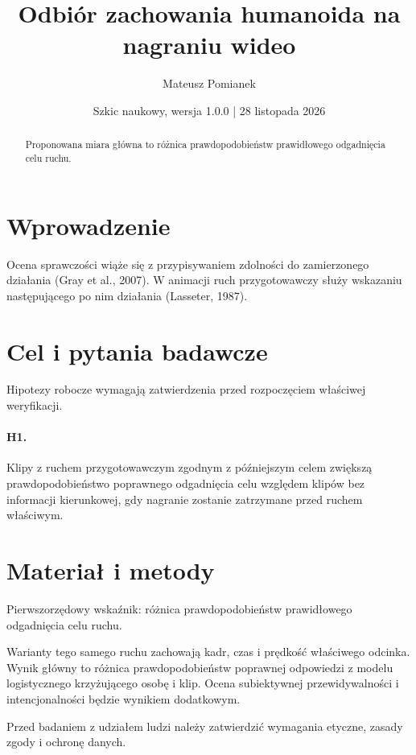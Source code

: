\documentclass[11pt,a4paper]{article}
\title{Odbiór zachowania humanoida na nagraniu wideo}
\author{Mateusz Pomianek}
\date{Szkic naukowy, wersja 1.0.0 | 28 listopada 2026}
\begin{document}
\maketitle

\begin{abstract}

Proponowana miara główna to różnica prawdopodobieństw prawidłowego odgadnięcia celu ruchu.

\end{abstract}

\section{Wprowadzenie}

Ocena sprawczości wiąże się z przypisywaniem zdolności do zamierzonego działania (Gray et al., 2007). W animacji ruch przygotowawczy służy wskazaniu następującego po nim działania (Lasseter, 1987).

\section{Cel i pytania badawcze}

Hipotezy robocze wymagają zatwierdzenia przed rozpoczęciem właściwej weryfikacji.

\paragraph{H1.} Klipy z ruchem przygotowawczym zgodnym z późniejszym celem zwiększą prawdopodobieństwo poprawnego odgadnięcia celu względem klipów bez informacji kierunkowej, gdy nagranie zostanie zatrzymane przed ruchem właściwym.

\section{Materiał i metody}

Pierwszorzędowy wskaźnik: różnica prawdopodobieństw prawidłowego odgadnięcia celu ruchu.

Warianty tego samego ruchu zachowają kadr, czas i prędkość właściwego odcinka. Wynik główny to różnica prawdopodobieństw poprawnej odpowiedzi z modelu logistycznego krzyżującego osobę i klip. Ocena subiektywnej przewidywalności i intencjonalności będzie wynikiem dodatkowym.

Przed badaniem z udziałem ludzi należy zatwierdzić wymagania etyczne, zasady zgody i ochronę danych.
\end{document}
